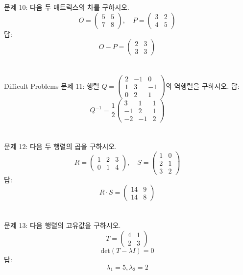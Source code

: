 \documentclass[fleqn]{article}
\begin{document}
\noindent 문제 10: 다음 두 매트릭스의 차를 구하시오. 
\[
O = \begin{pmatrix}
5 & 5 \\
7 & 8 
\end{pmatrix}, \quad P = \begin{pmatrix}
3 & 2 \\
4 & 5 
\end{pmatrix}
\] \noindent 답: \\
\[
O - P = \begin{pmatrix}
2 & 3 \\
3 & 3 
\end{pmatrix}
\] \\\\

 Difficult Problems
\noindent 문제 11: 행렬 \(Q = \begin{pmatrix}
2 & -1 & 0 \\
1 & 3 & -1 \\
0 & 2 & 1 
\end{pmatrix}\)의 역행렬을 구하시오. \noindent 답: \\
\[
Q^{-1} = \frac{1}{2} \begin{pmatrix}
3 & 1 & 1 \\
-1 & 2 & 1 \\
-2 & -1 & 2 
\end{pmatrix}
\]  \\\\

\noindent 문제 12: 다음 두 행렬의 곱을 구하시오.
\[
R = \begin{pmatrix}
1 & 2 & 3 \\
0 & 1 & 4 
\end{pmatrix}, \quad S = \begin{pmatrix}
1 & 0 \\
2 & 1 \\
3 & 2 
\end{pmatrix}
\] \noindent 답: \\
\[
R \cdot S = \begin{pmatrix}
14 & 9 \\
14 & 8 
\end{pmatrix}
\] \\\\

\noindent 문제 13: 다음 행렬의 고유값을 구하시오.
\[
T = \begin{pmatrix}
4 & 1 \\
2 & 3 
\end{pmatrix}
\] 
\[
\text{det}(T - \lambda I) = 0
\] \noindent 답: \\
\[
\lambda_1 = 5, \lambda_2 = 2
\] \\\\
\end{document}
